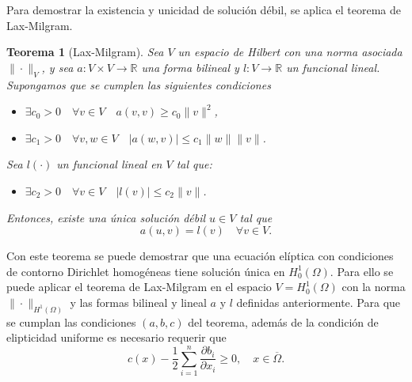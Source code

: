 \documentclass[a4paper,11pt,spanish, twoside, leqno]{tfg-uam}
\newtheorem{teor}{Teorema}[chapter]
\theoremstyle{definition}
\begin{document}
Para demostrar la existencia y unicidad de solución débil, se aplica el teorema de Lax-Milgram. 

\begin{teor}[Lax-Milgram]
    Sea $V$ un espacio de Hilbert con una norma asociada $\|\cdot\|_V$, y sea $a:V\times V\rightarrow\mathbb{R}$ una forma bilineal y $l:V\rightarrow\mathbb{R}$ un funcional lineal. Supongamos que se cumplen las siguientes condiciones
    \begin{itemize}
        \item[(a)] $\exists c_0 > 0 \quad \forall v \in V \quad a(v,v) \geq c_0\|v\|^2$,
        \item[(b)] $\exists c_1 > 0 \quad \forall v, w \in V \quad |a(w,v)| \leq c_1\|w\|\|v\|$.
    \end{itemize}
    Sea $l(\cdot)$ un funcional lineal en $V$ tal que:
    \begin{itemize}
        \item[(c)] $\exists c_2 > 0 \quad \forall v \in V \quad |l(v)| \leq c_2\|v\|$.
    \end{itemize}
    Entonces, existe una única solución débil $u\in V$ tal que
    \begin{equation*}
        a(u,v) = l(v) \quad \forall v\in V.
    \end{equation*}
\end{teor}
Con este teorema se puede demostrar que una ecuación elíptica con condiciones de contorno Dirichlet homogéneas tiene solución única en $H^1_0(\Omega)$. Para ello se puede aplicar el teorema de Lax-Milgram en el espacio $V=H^1_0(\Omega)$ con la norma $\|\cdot\|_{H^1(\Omega)}$ y las formas bilineal y lineal $a$ y $l$ definidas anteriormente. Para que se cumplan las condiciones $(a,b,c)$ del teorema, además de la condición de elipticidad uniforme es necesario requerir que
\begin{equation}\label{eq:condiciones_LaxMilgram_extra}
    c(x) - \frac{1}{2} \sum_{i=1}^n \frac{\partial b_i}{\partial x_i} \geq 0, \quad x \in \overline{\Omega}.
\end{equation}
\end{document}
